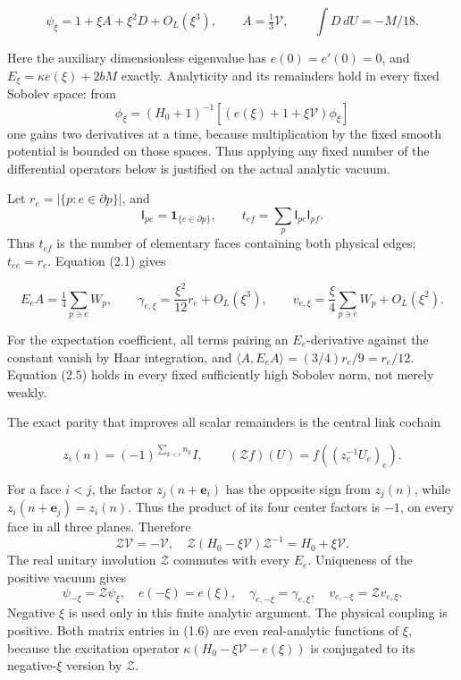 \documentclass[
  11pt,
]{article}
\begin{document}
\[
\psi_\xi=1+\xi A+\xi^2D+O_L(\xi^3),\qquad
A=\tfrac13\mathcal V,\qquad
\int D\,dU=-M/18.
\tag{2.3}
\]

Here the auxiliary dimensionless eigenvalue has \(e(0)=e'(0)=0\), and
\(E_\xi=\kappa e(\xi)+2bM\) exactly. Analyticity and its remainders hold
in every fixed Sobolev space: from \[
\phi_\xi=(H_0+1)^{-1}[(e(\xi)+1+\xi\mathcal V)\phi_\xi]
\] one gains two derivatives at a time, because multiplication by the
fixed smooth potential is bounded on those spaces. Thus applying any
fixed number of the differential operators below is justified on the
actual analytic vacuum.

Let \(r_e=|\{p:e\in\partial p\}|\), and \[
\mathsf I_{pe}=\mathbf1_{\{e\in\partial p\}},\qquad
t_{ef}=\sum_p\mathsf I_{pe}\mathsf I_{pf}.
\tag{2.4}
\] Thus \(t_{ef}\) is the number of elementary faces containing both
physical edges; \(t_{ee}=r_e\). Equation (2.1) gives

\[
E_eA=\tfrac14\sum_{p\ni e}W_p,\qquad
\gamma_{e,\xi}=\frac{\xi^2}{12}r_e+O_L(\xi^3),\qquad
v_{e,\xi}=\frac{\xi}{4}\sum_{p\ni e}W_p+O_L(\xi^2).
\tag{2.5}
\]

For the expectation coefficient, all terms pairing an \(E_e\)-derivative
against the constant vanish by Haar integration, and
\(\langle A,E_eA\rangle=(3/4)r_e/9=r_e/12\). Equation (2.5) holds in
every fixed sufficiently high Sobolev norm, not merely weakly.

The exact parity that improves all scalar remainders is the central link
cochain

\[
z_i(n)=(-1)^{\sum_{k<i}n_k}I,\qquad
(\mathcal Zf)(U)=f((z_e^{-1}U_e)_e).
\tag{2.6}
\]

For a face \(i<j\), the factor \(z_j(n+\mathbf e_i)\) has the opposite
sign from \(z_j(n)\), while \(z_i(n+\mathbf e_j)=z_i(n)\). Thus the
product of its four center factors is \(-1\), on every face in all three
planes. Therefore \[
\mathcal Z\mathcal V=-\mathcal V,\quad
\mathcal Z(H_0-\xi\mathcal V)\mathcal Z^{-1}=H_0+\xi\mathcal V.
\] The real unitary involution \(\mathcal Z\) commutes with every
\(E_e\). Uniqueness of the positive vacuum gives \[
\psi_{-\xi}=\mathcal Z\psi_\xi,\quad e(-\xi)=e(\xi),\quad
\gamma_{e,-\xi}=\gamma_{e,\xi},\quad
v_{e,-\xi}=\mathcal Zv_{e,\xi}.
\tag{2.7}
\] Negative \(\xi\) is used only in this finite analytic argument. The
physical coupling is positive. Both matrix entries in (1.6) are even
real-analytic functions of \(\xi\), because the excitation operator
\(\kappa(H_0-\xi\mathcal V-e(\xi))\) is conjugated to its
negative-\(\xi\) version by \(\mathcal Z\).
\end{document}
